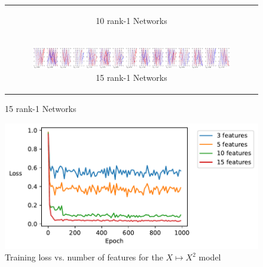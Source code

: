 \documentclass{article}
\theoremstyle{plain}
\theoremstyle{definition}
\theoremstyle{remark}
\begin{document}
\begin{figure}[ht]
\begin{minipage}{\textwidth}
\begin{tabular}{c}
\begin{subfigure}{0.3\textwidth}
                \caption{10 rank-1 Networks}
            \end{subfigure} \\ %
            \begin{subfigure}{0.3\textwidth}
                \centering
                \includegraphics[width=\linewidth]{../figures/s10_squared_decompositions_feature15.pdf}
                \caption{15 rank-1 Networks}
            \end{subfigure} 
        \end{tabular}
    \end{minipage}

\end{figure}

\begin{figure}[ht]
    \centerline{\includegraphics[width=\textwidth]{../figures/s11_squared_features_vs_loss.pdf}}
    \centering
    \caption{Training loss vs. number of features for the $X \mapsto X^2$ model}\label{fig:s11_squared_features_vs_loss}
\end{figure}
\end{document}
